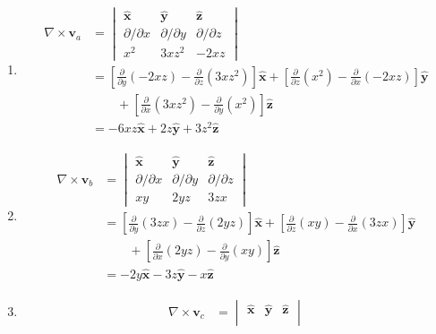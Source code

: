\documentclass[a4paper]{article}
\begin{document}
\begin{enumerate}[label=(\alph*)]
	\item \begin{align*}
		\nabla \times \pmb{v}_{a} & = \begin{vmatrix}
			\pmb{\hat{x}} & \pmb{\hat{y}} & \pmb{\hat{z}} \\
			\partial / \partial x & \partial / \partial y & \partial / \partial z \\
			x^{2} & 3xz^{2} & -2xz
		\end{vmatrix} \\
		& = \!\left[ \frac{\partial }{\partial y}\!\left( -2xz \right) - \frac{\partial }{\partial z}\!\left( 3xz^{2} \right)\right]\pmb{\hat{x}} + \!\left[ \frac{\partial }{\partial z}\!\left( x^{2} \right) - \frac{\partial }{\partial x}\!\left( -2xz \right) \right]\pmb{\hat{y}} \\
		& \qquad + \!\left[ \frac{\partial }{\partial x}\!\left( 3xz^{2} \right) - \frac{\partial }{\partial y}\!\left( x^{2} \right) \right]\pmb{\hat{z}} \\
		& = -6xz \pmb{\hat{x}} + 2z \pmb{\hat{y}} + 3z^{2}\pmb{\hat{z}}
	\end{align*}
	\item \begin{align*}
		\nabla \times \pmb{v}_{b} & = \begin{vmatrix}
			\pmb{\hat{x}} & \pmb{\hat{y}} & \pmb{\hat{z}} \\
			\partial / \partial x & \partial / \partial y & \partial / \partial z \\
			xy & 2yz & 3zx
		\end{vmatrix} \\
					  & = \!\left[ \frac{\partial }{\partial y}\!\left( 3zx \right) - \frac{\partial }{\partial z}\!\left( 2yz \right) \right]\pmb{\hat{x}} + \!\left[ \frac{\partial }{\partial z}\!\left( xy \right) - \frac{\partial }{\partial x}\!\left( 3zx \right) \right]\pmb{\hat{y}} \\
					  & \qquad + \!\left[ \frac{\partial }{\partial x}\!\left( 2yz \right) - \frac{\partial }{\partial y}\!\left( xy \right) \right]\pmb{\hat{z}} \\
					  & = -2y \pmb{\hat{x}} - 3z \pmb{\hat{y}} - x \pmb{\hat{z}}
	\end{align*}
	\item \begin{align*}
		\nabla \times \pmb{v}_{c} & = \begin{vmatrix}
			\pmb{\hat{x}} & \pmb{\hat{y}} & \pmb{\hat{z}} \\

\end{vmatrix}
\end{align*}
\end{enumerate}
\end{document}
